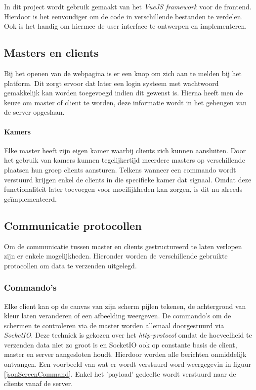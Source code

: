 In dit project wordt gebruik gemaakt van het \textit{VueJS framework} voor de frontend. Hierdoor is het eenvoudiger om de code in verschillende bestanden te verdelen. Ook is het handig om hiermee de user interface te ontwerpen en implementeren. 


\subsection{Masters en clients}
Bij het openen van de webpagina is er een knop om zich aan te melden bij het platform.
Dit zorgt ervoor dat later een login systeem met wachtwoord gemakkelijk kan worden toegevoegd indien dit gewenst is.
Hierna heeft men de keuze om master of client te worden, deze informatie wordt in het geheugen van de server opgeslaan. 

\paragraph{Kamers} Elke master heeft zijn eigen kamer waarbij clients zich kunnen aansluiten. Door het gebruik van kamers kunnen tegelijkertijd meerdere masters op verschillende plaatsen hun groep clients aansturen.  Telkens wanneer een commando wordt verstuurd krijgen enkel de clients in die specifieke kamer dat signaal. Omdat deze functionaliteit later toevoegen voor moeilijkheden kan zorgen, is dit nu alreeds geïmplementeerd.

\subsection{Communicatie protocollen}
Om de communicatie tussen master en clients gestructureerd te laten verlopen zijn er enkele mogelijkheden.
Hieronder worden de verschillende gebruikte protocollen om data te verzenden uitgelegd.
\subsubsection{Commando's}
Elke client kan op de canvas van zijn scherm pijlen tekenen, de achtergrond van kleur laten veranderen of een afbeelding weergeven. De commando's om de schermen te controleren via de master worden allemaal doorgestuurd via \textit{SocketIO}. Deze techniek is gekozen over het \textit{http-protocol} omdat de hoeveelheid te verzenden data niet zo groot is en SocketIO ook op constante basis de client, master en server aangesloten houdt. Hierdoor worden alle berichten onmiddelijk ontvangen. Een voorbeeld van wat er wordt verstuurd word weergegevin in figuur \ref{jsonScreenCommand}.
Enkel het 'payload' gedeelte wordt verstuurd naar de clients vanaf de server.

